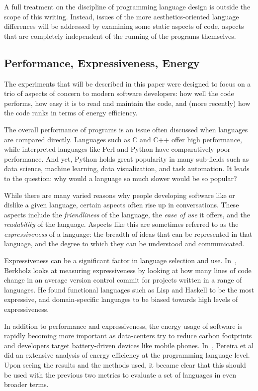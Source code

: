 A full treatment on the discipline of programming language design is outside the scope of this writing. Instead, issues of the more aesthetics-oriented language differences will be addressed by examining some static aspects of code, aspects that are completely independent of the running of the programs themselves.

\subsection{Performance, Expressiveness, Energy}

The experiments that will be described in this paper were designed to focus on a trio of aspects of concern to modern software developers: how well the code performs, how easy it is to read and maintain the code, and (more recently) how the code ranks in terms of energy efficiency.

The overall performance of programs is an issue often discussed when languages are compared directly. Languages such as C and C++ offer high performance, while interpreted languages like Perl and Python have comparatively poor performance. And yet, Python holds great popularity in many sub-fields such as data science, machine learning, data visualization, and task automation. It leads to the question: why would a language so much slower would be so popular?

While there are many varied reasons why people developing software like or dislike a given language, certain aspects often rise up in conversations. These aspects include the \textit{friendliness} of the language, the \textit{ease of use} it offers, and the \textit{readability} of the language. Aspects like this are sometimes referred to as the \textit{expressiveness} of a language: the breadth of ideas that can be represented in that language, and the degree to which they can be understood and communicated.

Expressiveness can be a significant factor in language selection and use. In~\cite{berkholz}, Berkholz looks at measuring expressiveness by looking at how many lines of code change in an average version control commit for projects written in a range of languages. He found functional languages such as Lisp and Haskell to be the most expressive, and domain-specific languages to be biased towards high levels of expressiveness.

In addition to performance and expressiveness, the energy usage of software is rapidly becoming more important as data-centers try to reduce carbon footprints and developers target battery-driven devices like mobile phones. In~\cite{pereira}, Pereira et al did an extensive analysis of energy efficiency at the programming language level. Upon seeing the results and the methods used, it became clear that this should be used with the previous two metrics to evaluate a set of languages in even broader terms.

